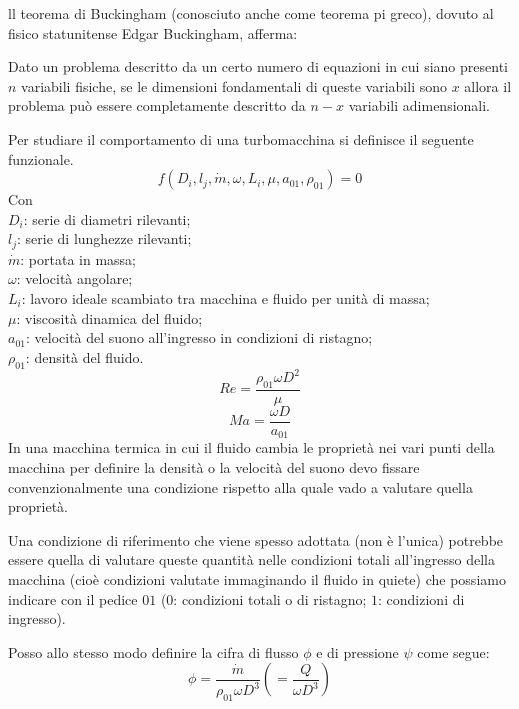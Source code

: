 ll teorema di Buckingham (conosciuto anche come teorema pi greco), dovuto al fisico statunitense Edgar Buckingham, afferma:
\begin{quoting}
Dato un problema descritto da un certo numero di equazioni in cui siano presenti $n$ variabili fisiche, se le dimensioni fondamentali di queste variabili sono $x$ allora il problema può essere completamente descritto da $n - x$ variabili adimensionali.
\end{quoting}
Per studiare il comportamento di una turbomacchina si definisce il seguente funzionale.
\begin{equation}
f(D_i,l_j,\dot{m},\omega,L_i,\mu,a_{01},\rho_{01})=0
\end{equation}
Con\\
$D_i$: serie di diametri rilevanti;\\
$l_j$: serie di lunghezze rilevanti;\\
$\dot{m}$: portata in massa;\\
$\omega$: velocità angolare;\\
$L_i$: lavoro ideale scambiato tra macchina e fluido per unità di massa;\\
$\mu$: viscosità dinamica del fluido;\\
$a_{01}$: velocità del suono all'ingresso in condizioni di ristagno;\\
$\rho_{01}$: densità del fluido.
\begin{equation}
Re= \frac{\rho_{01} \omega D^2}{\mu}
\end{equation}
\begin{equation}
Ma= \frac{\omega D}{a_{01}}
\end{equation}
In una macchina termica in cui il fluido cambia le proprietà nei vari punti della macchina per definire la densità o la velocità del suono devo fissare
convenzionalmente una condizione rispetto alla quale vado a valutare quella
proprietà. 

Una condizione di riferimento che viene spesso adottata (non è
l’unica) potrebbe essere quella di valutare queste quantità nelle condizioni
totali all’ingresso della macchina (cioè condizioni valutate immaginando il fluido in quiete) che possiamo indicare con il pedice $01$ ($0$: condizioni totali o di ristagno; $1$: condizioni di ingresso).

Posso allo stesso modo definire la cifra di flusso  $\phi$ e di pressione $\psi$ come segue:
\begin{equation}
\phi = \frac{\dot{m}}{\rho_{01} \omega D^3}(=\frac{Q}{\omega D^3})
\end{equation}

